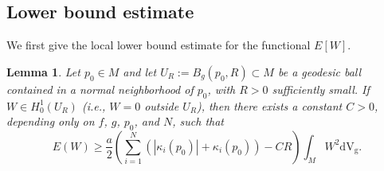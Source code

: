 \documentclass[12pt,reqno]{amsart}
\newtheorem{lemma}{Lemma}[section]
\newcommand{\V}{\mathrm{d} \mathrm{V_g}}
\numberwithin{equation}{section}
\begin{document}
\subsection{Lower bound estimate}
 We first give the local  lower bound estimate for the functional $E[W]$.
\begin{lemma}\label{lem:2.3}
Let \(p_0 \in M\) and let \(U_R:=B_g(p_0,R)\subset M\) be a geodesic ball contained in a normal neighborhood of \(p_0\), with \(R>0\) sufficiently small. If \(W\in H_0^1(U_R)\) (i.e.,  $W=0$ outside $U_R$), then there exists a constant \(C>0\), depending only on \(f\), \(g\), \(p_0\), and \(N\), such that
\begin{equation}\label{I:llb}
E(W) \geq \frac{a}{2} \left( \sum_{i=1}^N \left( |\kappa_i(p_0)| + \kappa_i(p_0) \right) - C R \right) \int_M W^2 \V.
\end{equation}
\end{lemma}
\end{document}
